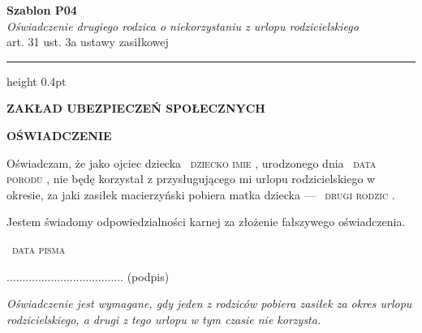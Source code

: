 \documentclass[11pt,a4paper]{article}
\newcommand{\Pole}[1]{%
  \textcolor{szary}{\dotfill}\,%
  {\scriptsize\textcolor{szary}{\textsc{#1}}}%
}
\newcommand{\NaglowekPisma}[1]{%
  \par\vspace{0.8em}%
  \begin{center}%
    {\large\bfseries\MakeUppercase{#1}}%
  \end{center}%
  \vspace{0.4em}%
}
\begin{document}
\begin{flushright}
{\footnotesize\color{szary}
\textbf{Szablon P04}\\
{\itshape Oświadczenie drugiego rodzica o niekorzystaniu z urlopu rodzicielskiego}\\
art. 31 ust. 3a ustawy zasiłkowej}\
\end{flushright}

\vspace{0.5em}
{\color{ramka}\hrule height 0.4pt}
\vspace{0.8em}

\NaglowekPisma{ZAKŁAD UBEZPIECZEŃ SPOŁECZNYCH}

\NaglowekPisma{OŚWIADCZENIE}

Oświadczam, że jako ojciec dziecka \Pole{dziecko imie}, urodzonego dnia
\Pole{data porodu}, nie będę korzystał z przysługującego mi urlopu
rodzicielskiego w okresie, za jaki zasiłek macierzyński pobiera matka
dziecka --- \Pole{drugi rodzic}.

Jestem świadomy odpowiedzialności karnej za złożenie fałszywego oświadczenia.

\Pole{data pisma}
.....................................
(podpis)

\vfill
{\footnotesize\textcolor{szary}\itshape Oświadczenie jest wymagane, gdy jeden z rodziców pobiera zasiłek za okres urlopu rodzicielskiego, a drugi z tego urlopu w tym czasie nie korzysta. }
\end{document}
